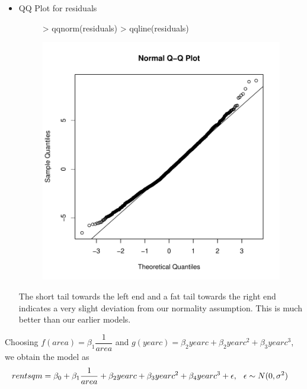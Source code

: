 \documentclass[12pt]{article}
\begin{document}
\begin{itemize}
\item QQ Plot for residuals
\begin{figure}[H]
\begin{Schunk}
\begin{Sinput}
> qqnorm(residuals)
> qqline(residuals)
\end{Sinput}
\end{Schunk}
\includegraphics{HW3-048}
\end{figure}
The short tail towards the left end and a fat tail towards the right end indicates a very slight deviation from our normality assumption. This is much better than our earlier models.
\end{itemize}

\item
Choosing $f(area)=\beta_1 \dfrac{1}{area}$ and $g(yearc)=\beta_2 yearc + \beta_2 yearc^2 + \beta_3 yearc^3$, we obtain the model as
\begin{equation*}
\begin{aligned}
rentsqm &= \beta_0 + \beta_1 \dfrac{1}{area} + \beta_2 yearc + \beta_3 yearc^2 + \beta_4 yearc^3 + \epsilon, \hspace{0.1in} \epsilon \sim N(0,\sigma^2)
\end{aligned}
\end{equation*}
\end{document}
